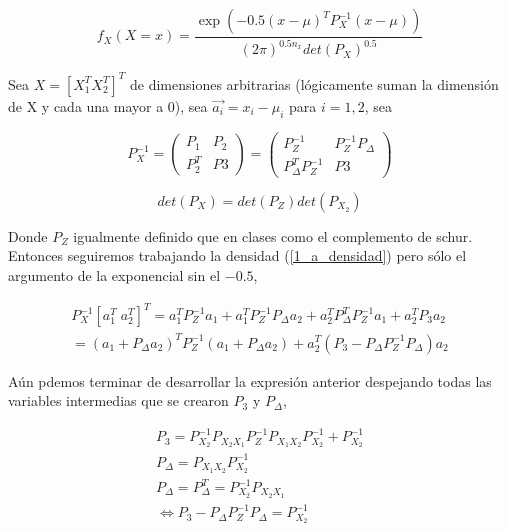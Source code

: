 		\begin{equation}
			f_X(X=x)=\frac{ \exp(-0.5(x-\mu)^TP_X^{-1}(x-\mu)) }{ (2\pi)^{0.5n_x} det(P_X)^{0.5} } 
			\label{1_a_densidad}
		\end{equation}

		Sea $X = [X_1^T X_2^T]^T$ de dimensiones arbitrarias (lógicamente suman la dimensión de X y cada una mayor a 0), sea $\vec{a_i} = x_i - \mu_i$ para $i=1,2$, sea 

		\begin{equation}
			P_X^{-1} = 
			 \begin{pmatrix}
			  P_1 & P_2 \\
			  P_2^T & P3 
			 \end{pmatrix}
			 =
			 \begin{pmatrix}
			  P_Z^{-1} & P_Z^{-1}P_{\Delta} \\
			  P_{\Delta}^TP_Z^{-1}  & P3 
			 \end{pmatrix}
		\end{equation}

		\begin{equation}
			det(P_X) = det(P_Z)det(P_{X_2})
		\end{equation}

		Donde $P_Z$ igualmente definido que en clases como el complemento de schur. Entonces seguiremos trabajando la densidad (\ref{1_a_densidad}) pero sólo el argumento de la exponencial sin el $-0.5$,

		\begin{eqnarray}
			[a_1^T \; a_2^T]P_X^{-1}[a_1^T \; a_2^T]^T =a_1^T P_Z^{-1} a_1 + a_1^T P_Z^{-1} P_{\Delta} a_2 + a_2^T P_{\Delta}^T P_Z^{-1} a_1 + a_2^T P_3 a_2  \\
			= (a_1 + P_{\Delta} a_2)^T P_Z^{-1} (a_1 + P_{\Delta} a_2) + a_2^T( P_3 - P_{\Delta} P_Z^{-1} P_{\Delta}) a_2
			\label{1_a_casiherramienta}
		\end{eqnarray}

		Aún pdemos terminar de desarrollar la expresión anterior despejando todas las variables intermedias que se crearon $P_3$ y $P_\Delta$, 

		\begin{eqnarray}
			P_3 = P_{X_2}^{-1} P_{X_2X_1}P_Z^{-1}P_{X_1X_2}P_{X_2}^{-1} + P_{X_2}^{-1} \\
			P_\Delta = P_{X_1X_2} P_{X_2}^{-1}  \\
			P_\Delta=P_\Delta^T = P_{X_2}^{-1} P_{X_2X_1}\\
			\iff P_3 - P_{\Delta} P_Z^{-1} P_{\Delta} = P_{X_2}^{-1}
		\end{eqnarray}

